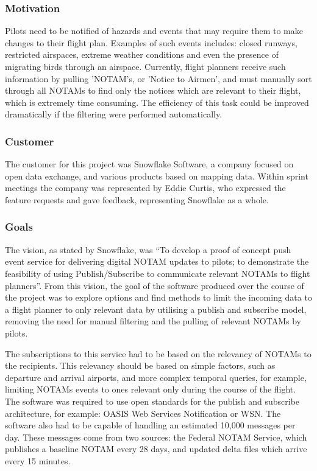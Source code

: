 \documentclass[a4paper, 12pt]{article}
\begin{document}
\subsubsection{Motivation}
Pilots need to be notified of hazards and events that may require them to make changes to their flight plan. Examples of such events includes: closed runways, restricted airspaces, extreme weather conditions and even the presence of migrating birds through an airspace. Currently, flight planners receive such information by pulling 'NOTAM's, or 'Notice to Airmen', and must manually sort through all NOTAMs to find only the notices which are relevant to their flight, which is extremely time consuming. The efficiency of this task could be improved dramatically if the filtering were performed automatically.

\subsubsection{Customer}

The customer for this project was Snowflake Software, a company focused on open data exchange, and various products based on mapping data. Within sprint meetings the company was represented by Eddie Curtis, who expressed the feature requests and gave feedback, representing Snowflake as a whole.

\subsubsection{Goals}

The vision, as stated by Snowflake, was ``To develop a proof of concept push event service for delivering digital NOTAM updates to pilots; to demonstrate the feasibility of using Publish/Subscribe to communicate relevant NOTAMs to flight planners''. From this vision, the goal of the software produced over the course of the project was to explore options and find methods to limit the incoming data to a flight planner to only relevant data by utilising a publish and subscribe model, removing the need for manual filtering and the pulling of relevant NOTAMs by pilots. 

The subscriptions to this service had to be based on the relevancy of NOTAMs to the recipients. This relevancy should be based on simple factors, such as departure and arrival airports, and more complex temporal queries, for example, limiting NOTAMs events to ones relevant only during the course of the flight. The software was required to use open standards for the publish and subscribe architecture, for example: OASIS Web Services Notification or WSN. The software also had to be capable of handling an estimated 10,000 messages per day. These messages come from two sources: the Federal NOTAM Service, which publishes a baseline NOTAM every 28 days, and updated delta files which arrive every 15 minutes. 
\end{document}
